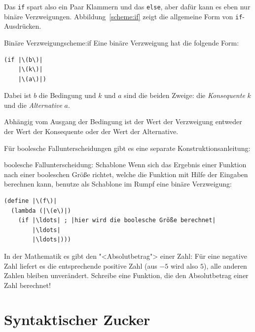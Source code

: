 %
Das \lstinline{if} spart also ein Paar Klammern und das \lstinline{else},
aber dafür kann es eben nur binäre Verzweigungen.
Abbildung~\ref{scheme:if} zeigt die allgemeine Form von
\lstinline{if}-Ausdrücken.
\begin{feature}{Binäre Verzweigung}{scheme:if}
  Eine binäre Verzweigung hat die folgende Form:
\begin{lstlisting}
(if |\(b\)|
    |\(k\)|
    |\(a\)|)
\end{lstlisting}
Dabei ist $b$ die Bedingung und $k$ und $a$ sind die
beiden Zweige: die \textit{Konsequente} $k$ und die
\textit{Alternative} $a$.

Abhängig vom Ausgang der
Bedingung ist der Wert der Verzweigung entweder der Wert der Konsequente
oder der Wert der Alternative.
\end{feature}
%
Für boolesche Fallunterscheidungen gibt es eine separate
Konstruktionsanleitung:
%
\begin{konstruktionsanleitung}{boolesche Fallunterscheidung: Schablone}
  \label{ka:boolesche-fallunterscheidung}
  Wenn sich das Ergebnis einer Funktion nach einer booleschen Größe
  richtet, welche die Funktion mit Hilfe der Eingaben berechnen kann,
  benutze als Schablone im Rumpf eine binäre Verzweigung:
\begin{lstlisting}
(define |\(f\)|
  (lambda (|\(e\)|)
    (if |\ldots| ; |hier wird die boolesche Größe berechnet|
        |\ldots|
        |\ldots|)))
\end{lstlisting}
\end{konstruktionsanleitung}

\begin{aufgabeinline}
  In der Mathematik es gibt den "<Absolutbetrag"> einer
  Zahl: Für eine negative Zahl liefert es die entsprechende positive
  Zahl (aus $-5$ wird also $5$), alle anderen Zahlen bleiben
  unverändert.  Schreibe eine Funktion, die den Absolutbetrag einer
  Zahl berechnet!
\end{aufgabeinline}

\section{Syntaktischer Zucker}

